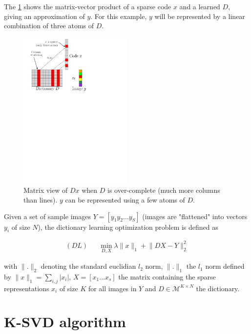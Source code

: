 The \cref{fig_overcomplete_matrix} shows the matrix-vector product of a sparse code $x$ and a learned $D$, giving an approximation of $y$. For this example, $y$ will be represented by a linear combination of three atoms of $D$.


\begin{figure}[!h] \centering
\includegraphics[width=0.5\textwidth]{figures/sparsity-matrix.pdf}
\caption{Matrix view of $Dx$ when $D$ is over-complete (much more columns than lines). $y$ can be represented using a few atoms of $D$.} \label{fig_overcomplete_matrix}
\end{figure}


Given a set of sample images $Y = [ y_1 y_2 \dots y_S ]$ (images are "flattened" into vectors $y_i$ of size $N$), the dictionary learning optimization problem is defined as

\begin{equation*}  \begin{aligned}
(DL) && \underset{D,X}{\min} \lambda \lVert x \rVert_1 + \lVert DX-Y \rVert^2_2 
\end{aligned} \label{eq_dict_learn} \end{equation*}

with $\lVert . \rVert_2$ denoting the standard euclidian $l_2$ norm, $\lVert . \rVert_1$ the $l_1$ norm defined by $\lVert x \rVert_1 = \sum_{i,j} |x_i|$, $X = [ x_1 \dots x_s ]$ the matrix containing the sparse representations $x_i$ of size $K$ for all images in $Y$ and $D \in \mathcal{M}^{K \times N}$ the dictionary.

\section{K-SVD algorithm}

